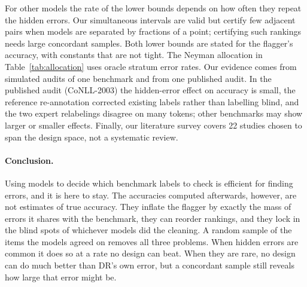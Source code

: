 For other models the rate of the lower bounds depends on how often they repeat the hidden errors. Our simultaneous intervals are valid but certify few adjacent pairs when models are separated by fractions of a point; certifying such rankings needs large concordant samples. Both lower bounds are stated for the flagger's accuracy, with constants that are not tight. The Neyman allocation in Table~\ref{tab:allocation} uses oracle stratum error rates. Our evidence comes from simulated audits of one benchmark and from one published audit. In the published audit (CoNLL-2003) the hidden-error effect on accuracy is small, the reference re-annotation corrected existing labels rather than labelling blind, and the two expert relabelings disagree on many tokens; other benchmarks may show larger or smaller effects. Finally, our literature survey covers 22 studies chosen to span the design space, not a systematic review.

\paragraph{Conclusion.} Using models to decide which benchmark labels to check is efficient for finding errors, and it is here to stay. The accuracies computed afterwards, however, are not estimates of true accuracy. They inflate the flagger by exactly the mass of errors it shares with the benchmark, they can reorder rankings, and they lock in the blind spots of whichever models did the cleaning. A random sample of the items the models agreed on removes all three problems. When hidden errors are common it does so at a rate no design can beat. When they are rare, no design can do much better than DR's own error, but a concordant sample still reveals how large that error might be.
